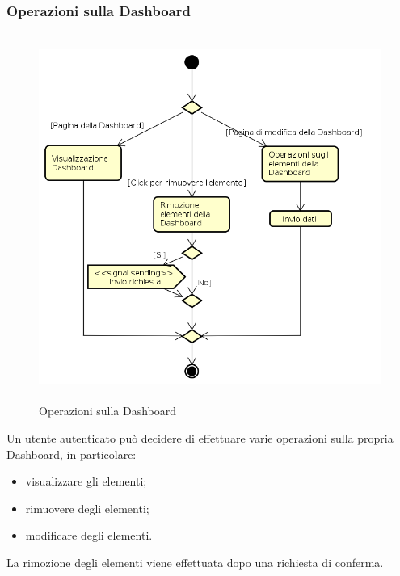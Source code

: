 \subsubsection{Operazioni sulla Dashboard}
\begin{figure}[H]
\begin{center}
\includegraphics[height=12cm]{res/sections/backend/activities/operazioniDashboard.png}
\caption{Operazioni sulla Dashboard}
\end{center}
\end{figure}
Un utente autenticato può decidere di effettuare varie operazioni sulla propria Dashboard, in particolare:
\begin{itemize}
\item visualizzare gli elementi;
\item rimuovere degli elementi;
\item modificare degli elementi.
\end{itemize}
La rimozione degli elementi viene effettuata dopo una richiesta di conferma.
\newpage
